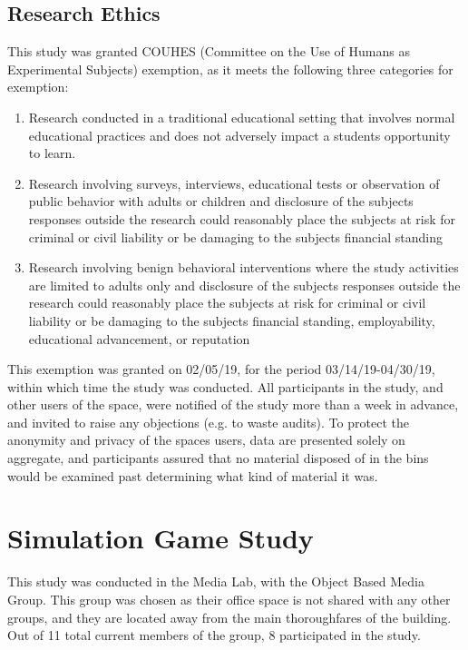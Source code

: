 \documentclass[nofonts,nols,justified,nobib]{tufte-book}
\begin{document}
\subsection*{Research Ethics}
This study was granted COUHES (Committee on the Use of Humans as Experimental Subjects) exemption, as it meets the following three categories for exemption:

\begin{enumerate}
  \item Research conducted in a traditional educational setting that involves normal educational practices and does not adversely impact a students opportunity to learn.
  \item Research involving surveys, interviews, educational tests or observation of public behavior with adults or children and disclosure of the subjects responses outside the research could reasonably place the subjects at risk for criminal or civil liability or be damaging to the subjects financial standing
  \item Research involving benign behavioral interventions where the study activities are limited to adults only and disclosure of the subjects responses outside the research could reasonably place the subjects at risk for criminal or civil liability or be damaging to the subjects financial standing, employability, educational advancement, or reputation
\end{enumerate}

This exemption was granted on 02/05/19, for the period 03/14/19-04/30/19, within which time the study was conducted. All participants in the study, and other users of the space, were notified of the study more than a week in advance, and invited to raise any objections (e.g. to waste audits). To protect the anonymity and privacy of the spaces users, data are presented solely on aggregate, and participants assured that no material disposed of in the bins would be examined past determining what kind of material it was.

\newpage

\section*{Simulation Game Study}
This study was conducted in the Media Lab, with the Object Based Media Group. This group was chosen as their office space is not shared with any other groups, and they are located away from the main thoroughfares of the building. Out of 11 total current members of the group, 8 participated in the study.
\end{document}
